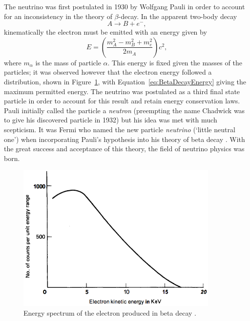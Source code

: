 The neutrino was first postulated in 1930 by Wolfgang Pauli \cite{Pauli1930} in order to account for an inconsistency in the theory of $\beta$-decay.  In the apparent two-body decay
\begin{equation}
A \rightarrow B + e^-,
\end{equation}
kinematically the electron must be emitted with an energy given by
\begin{equation}\label{eq:BetaDecayEnergy}
E = \left( \frac{m_A^2 - m_B^2 + m_e^2}{2m_A} \right) c^2,
\end{equation}
where $m_{\alpha}$ is the mass of particle $\alpha$.  This energy is fixed given the masses of the particles; it was observed however that the electron energy followed a distribution, shown in Figure~\ref{fig:BetaDecayEnergy}, with Equation~\ref{eq:BetaDecayEnergy} giving the maximum permitted energy.  The neutrino was postulated as a third final state particle in order to account for this result and retain energy conservation laws.  Pauli initially called the particle a \textit{neutron} (preempting the name Chadwick was to give his discovered particle in 1932) but his idea was met with much scepticism.  It was Fermi who named the new particle \textit{neutrino} (`little neutral one') when incorporating Pauli's hypothesis into his theory of beta decay \cite{Fermi1934Italian,Fermi1934German,Wilson1968}.  With the great success and acceptance of this theory, the field of neutrino physics was born.

\begin{figure}
  \centering
  \includegraphics[width=10cm]{ElectronEnergySpectrumBetaDecay.png}
  \caption[Energy spectrum of the electron produced in beta decay.]{Energy spectrum of the electron produced in beta decay \cite{Lewis1970}.}
  \label{fig:BetaDecayEnergy}
\end{figure}

